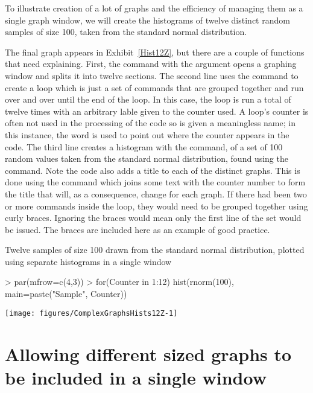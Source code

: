 To illustrate creation of a lot of graphs and the efficiency of managing them as a single graph window, we will create the histograms of twelve distinct random samples of size 100, taken from the standard normal distribution.

The final graph appears in Exhibit~\ref{Hist12Z}, but there are a couple of functions that need explaining. First, the  command with the  argument opens a graphing window and splits it into twelve sections. The second line uses the  command to create a loop which is just a set of commands that are grouped together and run over and over until the end of the loop. In this case, the loop is run a total of twelve times with an arbitrary lable given to the counter used. A loop's counter is often not used in the processing of the code so is given a meaningless name; in this instance, the word  is used to point out where the counter appears in the code. The third line creates a histogram with the  command, of a set of 100 random values taken from the standard normal distribution, found using the  command. Note the code also adds a title to each of the distinct graphs. This is done using the  command which joins some text with the counter number to form the title that will, as a consequence, change for each graph. If there had been two or more commands inside the loop, they would need to be grouped together using curly braces. Ignoring the braces would mean only the first line of the set would be issued. The braces are included here as an example of good practice.

\begin{exhibit}
\begin{center}
\caption{Twelve samples of size 100 drawn from the standard normal distribution, plotted using separate histograms in a single window}
\label{Hists12Z}
\begin{Schunk}
\begin{Sinput}
> par(mfrow=c(4,3))
> for(Counter in 1:12){
   hist(rnorm(100), main=paste("Sample", Counter))}
\end{Sinput}

\texttt{[image: figures/ComplexGraphsHists12Z-1]} \end{Schunk}
\end{center}
\end{exhibit}

\section{Allowing different sized graphs to be included in a single window}


